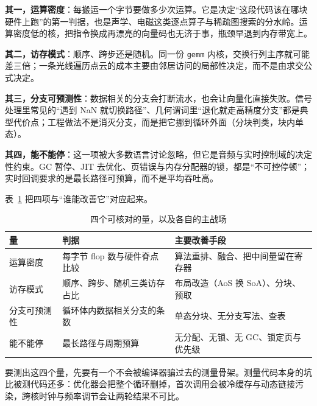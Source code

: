 \documentclass[12pt,a4paper,fontset=fandol]{ctexbook}
\newcommand{\Tp}[1]{\texttt{#1}}
\begin{document}
\textbf{其一，运算密度}：每搬运一个字节要做多少次运算。它是决定``这段代码该在哪块硬件上跑''的第一判据，也是声学、电磁这类逐点算子与稀疏图搜索的分水岭。运算密度低的核，把指令换成再漂亮的向量码也无济于事，瓶颈早退到内存带宽上。

\textbf{其二，访存模式}：顺序、跨步还是随机。同一份 \Tp{gemm} 内核，交换行列主序就可能差三倍；一条光线遍历点云的成本主要由邻居访问的局部性决定，而不是由求交公式决定。

\textbf{其三，分支可预测性}：数据相关的分支会打断流水，也会让向量化直接失败。信号处理里常见的``遇到 NaN 就切换路径''、几何谓词里``退化就走高精度分支''都是典型代价点；工程做法不是消灭分支，而是把它挪到循环外面（分块判类，块内单态）。

\textbf{其四，能不能停}：这一项被大多数语言讨论忽略，但它是音频与实时控制域的决定性约束。GC 暂停、JIT 去优化、页错误与内存分配器的锁，都是``不可控停顿''；实时回调要求的是最长路径可预算，而不是平均吞吐高。

表~\ref{tab:ch01-four} 把四项与``谁能改善它''对应起来。

\begin{table}[H]
\centering
\caption{四个可核对的量，以及各自的主战场}
\label{tab:ch01-four}
\small
\begin{tabular}{@{}>{\raggedright\arraybackslash}p{}
  >{\raggedright\arraybackslash}p{}
  >{\raggedright\arraybackslash}p{}@{}}
\toprule
量 & 判据 & 主要改善手段 \\
\midrule
运算密度 & 每字节 flop 数与硬件脊点比较 &
  算法重排、融合、把中间量留在寄存器 \\
访存模式 & 顺序、跨步、随机三类访存占比 &
  布局改造（AoS 换 SoA）、分块、预取 \\
分支可预测性 & 循环体内数据相关分支的条数 &
  单态分块、无分支写法、查表 \\
能不能停 & 最长路径与周期预算 &
  无分配、无锁、无 GC、锁定页与优先级 \\
\bottomrule
\end{tabular}
\end{table}

要测出这四个量，先要有一个不会被编译器骗过去的测量骨架。测量代码本身的坑比被测代码还多：优化器会把整个循环删掉，首次调用会被冷缓存与动态链接污染，跨核时钟与频率调节会让两轮结果不可比。
\end{document}
